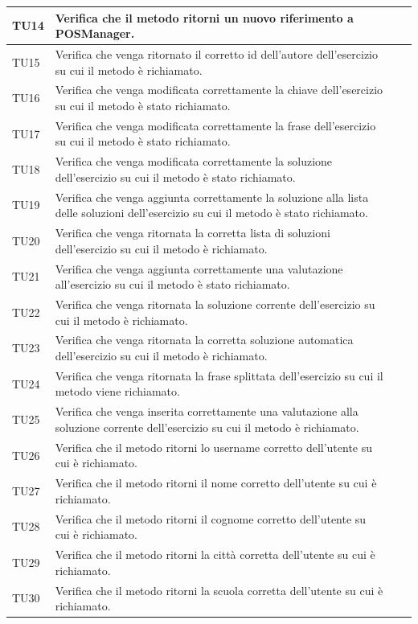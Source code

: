 \begin{longtable}{|>{\centering\arraybackslash}m{1.6cm}|>{\centering\arraybackslash}m{6.41cm}|>{\centering\arraybackslash}m{3.1cm}| c |}
		TU14 & Verifica che il metodo ritorni un nuovo riferimento a POSManager.\\ \hline
		TU15 & Verifica che venga ritornato il corretto id dell'autore dell'esercizio su cui il metodo è richiamato.\\ \hline
		TU16 & Verifica che venga modificata correttamente la chiave dell'esercizio su cui il metodo è stato richiamato.\\ \hline
		TU17 & Verifica che venga modificata correttamente la frase dell'esercizio su cui il metodo è stato richiamato.\\ \hline
		TU18 & Verifica che venga modificata correttamente la soluzione dell'esercizio su cui il metodo è stato richiamato.\\ \hline
		TU19 & Verifica che venga aggiunta correttamente la soluzione alla lista delle soluzioni dell'esercizio su cui il metodo è stato richiamato.\\ \hline
		TU20 & Verifica che venga ritornata la corretta lista di soluzioni dell'esercizio su cui il metodo è richiamato.\\ \hline
		TU21 & Verifica che venga aggiunta correttamente una valutazione all'esercizio su cui il metodo è stato richiamato.\\ \hline
		TU22 & Verifica che venga ritornata la soluzione corrente dell'esercizio su cui il metodo è richiamato.\\ \hline
		TU23 & Verifica che venga ritornata la corretta soluzione automatica dell'esercizio su cui il metodo è richiamato. \\ \hline
		TU24 & Verifica che venga ritornata la frase splittata dell'esercizio su cui il metodo viene richiamato.\\ \hline
		TU25 & Verifica che venga inserita correttamente una valutazione alla soluzione corrente dell'esercizio su cui il metodo è richiamato.\\ \hline		
		TU26 & Verifica che il metodo ritorni lo username corretto dell'utente su cui è richiamato.\\ \hline
		TU27 & Verifica che il metodo ritorni il nome corretto dell'utente su cui è richiamato.  \\ \hline
		TU28 & Verifica che il metodo ritorni il cognome corretto dell'utente su cui è richiamato. \\ \hline
		TU29 & Verifica che il metodo ritorni la città corretta dell'utente su cui è richiamato.\\ \hline
		TU30 & Verifica che il metodo ritorni la scuola corretta dell'utente su cui è richiamato. \\ \hline

\end{longtable}
